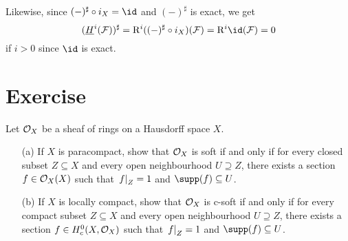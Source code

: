 \documentclass[../main.tex]{subfiles}
\begin{document}
Likewise, since $(-)^\sharp \circ i_X = \id$ and $(-)^\sharp$ is exact, we get
\[(\underline{H}^i(\sh F))^\sharp = \rightderived^i((-)^\sharp \circ i_X)(\sh F) = \rightderived^i \id(\sh F) = 0\]
if $i>0$ since $\id$ is exact.

\section*{Exercise}

\begin{exe} Let $\mathcal{O}_X$ be a sheaf of rings on a Hausdorff space $X$.
\begin{enumerate}
    \item[(a)] If $X$ is paracompact, show that $\mathcal{O}_X$ is soft if and only if for every closed subset $Z\subseteq X$ and every open neighbourhood $U\supseteq Z$, there exists a section $f\in \mathcal{O}_X(X)$ such that $\left.f\right|_{Z} = 1$ and $\supp(f)\subseteq U$. 
    \item[(b)] If $X$ is locally compact, show that $\mathcal{O}_X$ is c-soft if and only if for every compact subset $Z\subseteq X$ and every open neighbourhood $U\supseteq Z$, there exists a section $f\in H^0_c(X, \mathcal{O}_X)$ such that $\left.f\right|_{Z} = 1$ and $\supp(f) \subseteq U$. 
\end{enumerate}

\end{exe}
\end{document}
